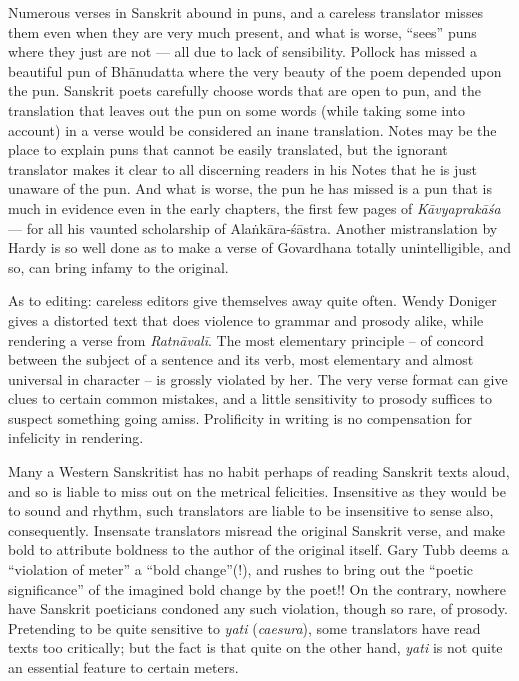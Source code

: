 Numerous verses in Sanskrit abound in puns, and a careless translator misses them even when they are very much present, and what is worse, “sees” puns where they just are not --- all due to lack of sensibility. Pollock has missed a beautiful pun of Bhānudatta where the very beauty of the poem depended upon the pun. Sanskrit poets carefully choose words that are open to pun, and the translation that leaves out the pun on some words (while taking some into account) in a verse would be considered an inane translation. Notes may be the place to explain puns that cannot be easily translated, but the ignorant translator makes it clear to all discerning readers in his Notes that he is just unaware of the pun. And what is worse, the pun he has missed is a pun that is much in evidence even in the early chapters, the first few pages of \textsl{Kāvyaprakāśa} --- for all his vaunted scholarship of Alaṅkāra-śāstra. Another mistranslation by Hardy is so well done as to make a verse of Govardhana totally unintelligible, and so, can bring infamy to the original.

As to editing: careless editors give themselves away quite often. Wendy Doniger gives a distorted text that does violence to grammar and prosody alike, while rendering a verse from \textsl{Ratnāvalī}. The most elementary principle -- of concord between the subject of a sentence and its verb, most elementary and almost universal in character -- is grossly violated by her. The very verse format can give clues to certain common mistakes, and a little sensitivity to prosody suffices to suspect something going amiss. Prolificity in writing is no compensation for infelicity in rendering.

Many a Western Sanskritist has no habit perhaps of reading Sanskrit texts aloud, and so is liable to miss out on the metrical felicities. Insensitive as they would be to sound and rhythm, such translators are liable to be insensitive to sense also, consequently. Insensate translators misread the original Sanskrit verse, and make bold to attribute boldness to the author of the original itself. Gary Tubb deems a “violation of meter” a “bold change”(!), and rushes to bring out the “poetic significance” of the imagined bold change by the poet!! On the contrary, nowhere have Sanskrit poeticians condoned any such violation, though so rare, of prosody. Pretending to be quite sensitive to \textsl{yati} (\textsl{caesura}), some translators have read texts too critically; but the fact is that quite on the other hand, \textsl{yati} is not quite an essential feature to certain meters.

